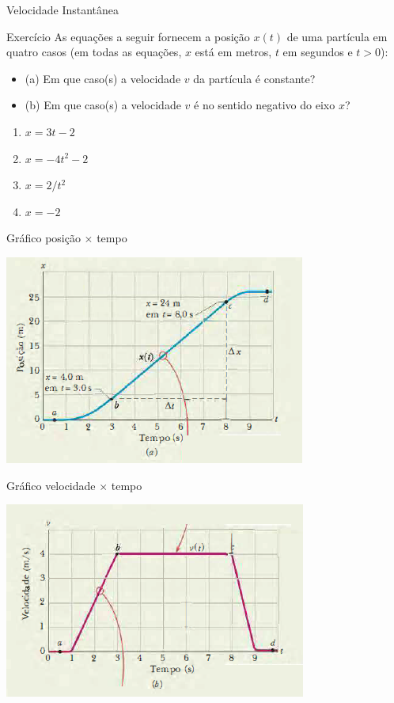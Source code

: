 \documentclass[xcolor=dvipsnames,table]{beamer}
\begin{document}
	\begin{frame}{Velocidade Instantânea}
		\begin{block}{Exercício}
			As equações a seguir fornecem a posição $x(t)$ de uma partícula em quatro casos (em todas as equações, $x$ está em metros, $t$ em segundos e $t > 0$): 
				\begin{itemize}
					\item[] (a) Em que caso(s) a velocidade $v$ da partícula é constante?
					\item[] (b) Em que caso(s) a velocidade $v$ é no sentido negativo do eixo $x$?
				\end{itemize}
			\begin{enumerate} \pause
				\item $x = 3t - 2$ \pause
				\item $x = -4t^2 - 2$ \pause
				\item $x = 2/t^2$ \pause
				\item $x = -2$ 
			\end{enumerate}
		\end{block}
	\end{frame}

	\begin{frame}{Gráfico posição $\times$ tempo}
		\begin{center}
			\includegraphics[scale=0.7]{images/fig2-6a}
		\end{center}
	\end{frame}

	\begin{frame}{Gráfico velocidade $\times$ tempo}
		\begin{center}
			\includegraphics[scale=0.7]{images/fig2-6b}
		\end{center}
	\end{frame}
\end{document}
